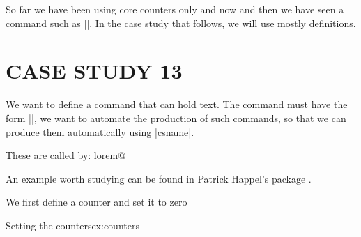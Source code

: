 So far we have been using \tex core counters only and now and then we have seen a \latexe command such as |\@nameuse|. In the case study that follows, we will use mostly \latexe definitions. 


\chapter*{CASE STUDY 13}

\noindent We want to define a command that can hold text. The command must have the form |\lorem@i|, we want to automate the production of such commands, so that we can produce them automatically using |csname|.

\topline
\begin{teXXX}

These are called by:
 \csname lorem@\endcsname%
\end{teXXX}
\bottomline

An example worth studying can be found in Patrick Happel's package .

We first define a counter and set it to zero


\begin{texexample}{Setting the counters}{ex:counters}
\makeatletter 
{}
\setcounter{lorem@count}{0}

\newcommand\lorem@default{1-7}

\newcommand\setloremdefault[1]{%
  \renewcommand{\lorem@default}{#1}}

\setloremdefault{1-2}  
\makeatother  
\end{texexample}



